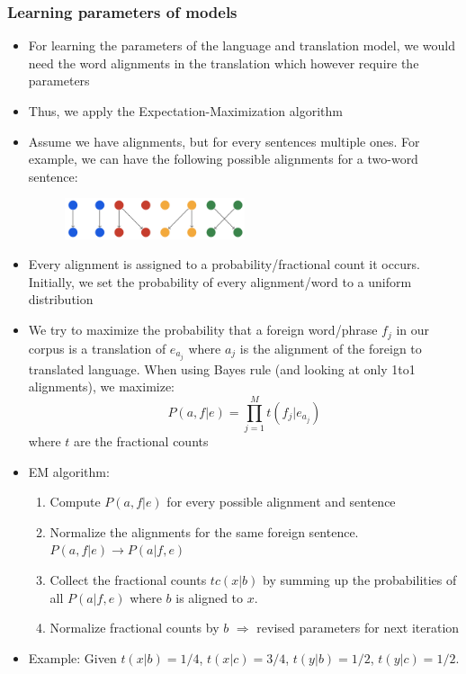 \subsubsection{Learning parameters of models}
\begin{itemize}
	\item For learning the parameters of the language and translation model, we would need the word alignments in the translation which however require the parameters
	\item Thus, we apply the Expectation-Maximization algorithm
	\item Assume we have alignments, but for every sentences multiple ones. For example, we can have the following possible alignments for a two-word sentence:
	\begin{figure}[ht]
		\centering
		\includegraphics[width=0.5\textwidth]{figures/translation_EM_alignment.png}
	\end{figure}
	\item Every alignment is assigned to a probability/fractional count it occurs. Initially, we set the probability of every alignment/word to a uniform distribution
	\item We try to maximize the probability that a foreign word/phrase $f_j$ in our corpus is  a translation of $e_{a_j}$ where $a_j$ is the alignment of the foreign to translated language. When using Bayes rule (and looking at only 1to1 alignments), we maximize:
	$$P(a,f|e) = \prod\limits_{j=1}^{M}t(f_j|e_{a_j})$$
	where $t$ are the fractional counts
	\item EM algorithm:
	\begin{enumerate}[label=Step \theenumi:]
		\item Compute $P(a,f|e)$ for every possible alignment and sentence
		\item Normalize the alignments for the same foreign sentence. $P(a,f|e)\to P(a|f,e)$
		\item Collect the fractional counts $tc(x|b)$ by summing up the probabilities of all $P(a|f,e)$ where $b$ is aligned to $x$. 
		\item Normalize fractional counts by $b$ $\Rightarrow$ revised parameters for next iteration
	\end{enumerate}
	\item Example: Given $t(x|b) = 1/4$, $t(x|c)= 3/4$, $t(y|b)= 1/2$, $t(y|c)= 1/2$.

\end{itemize}
